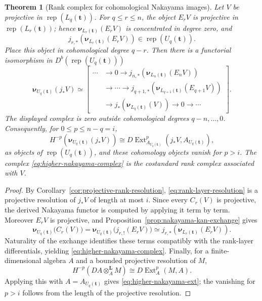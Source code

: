 \documentclass[12pt,reqno]{amsart}
\newtheorem{theorem}{Theorem}[section]
\theoremstyle{definition}
\theoremstyle{remark}
\newcommand{\Rep}{\operatorname{rep}}
\newcommand{\Ext}{\operatorname{Ext}}
\begin{document}
\begin{theorem}[Rank complex for cohomological Nakayama images]\label{thm:higher-nakayama-rank-complex}
Let $V$ be projective in $\Rep(L_q(\mathbf t))$.  For $q\le r\le n$, the
object $E_rV$ is projective in $\Rep(L_r(\mathbf t))$; hence
$\boldsymbol\nu_{L_r(\mathbf t)}(E_rV)$ is concentrated in degree zero, and
\[
j_{r,*}\!\left(\boldsymbol\nu_{L_r(\mathbf t)}(E_rV)\right)
\in\Rep(U_q(\mathbf t)).
\]
Place this object in cohomological degree $q-r$.  Then there is a functorial
isomorphism in $D^b(\Rep(U_q(\mathbf t)))$
\begin{equation}\label{eq:higher-nakayama-complex}
\boxed{
\boldsymbol\nu_{U_q(\mathbf t)}(j_*V)
\simeq
\left[
\begin{aligned}
\cdots&\longrightarrow 0\longrightarrow
j_{n,*}\!\left(\boldsymbol\nu_{L_n(\mathbf t)}(E_nV)\right)\\
&\longrightarrow\cdots\longrightarrow
j_{q+1,*}\!\left(\boldsymbol\nu_{L_{q+1}(\mathbf t)}(E_{q+1}V)\right)\\
&\longrightarrow
j_*\!\left(\boldsymbol\nu_{L_q(\mathbf t)}(V)\right)
\longrightarrow 0\longrightarrow\cdots
\end{aligned}
\right].}
\end{equation}
The displayed complex is zero outside cohomological degrees
$q-n,\ldots,0$.  Consequently, for $0\le p\le n-q=i$,
\begin{equation}\label{eq:higher-nakayama-ext}
H^{-p}\!\left(\boldsymbol\nu_{U_q(\mathbf t)}(j_*V)\right)
\cong
D\Ext^p_{A_{U_q(\mathbf t)}}
\!\left(j_*V,A_{U_q(\mathbf t)}\right),
\end{equation}
as objects of $\Rep(U_q(\mathbf t))$, and these cohomology objects vanish for
$p>i$.  The complex
\eqref{eq:higher-nakayama-complex} is the costandard rank complex associated
with $V$.
\end{theorem}

\begin{proof}
By Corollary~\ref{cor:projective-rank-resolution},
\eqref{eq:rank-layer-resolution} is a projective resolution of $j_*V$ of
length at most $i$.  Since every $C_r(V)$ is projective, the derived Nakayama
functor is computed by applying it term by term.  Moreover $E_rV$ is
projective, and Proposition~\ref{prop:nakayama-kan-exchange} gives
\[
\boldsymbol\nu_{U_q(\mathbf t)}\bigl(C_r(V)\bigr)
=
\boldsymbol\nu_{U_q(\mathbf t)}\bigl(j_{r,!}(E_rV)\bigr)
\simeq
j_{r,*}\!\left(\boldsymbol\nu_{L_r(\mathbf t)}(E_rV)\right).
\]
Naturality of the exchange identifies these terms compatibly with the
rank-layer differentials, yielding \eqref{eq:higher-nakayama-complex}.
Finally, for a finite-dimensional algebra $A$ and a bounded projective
resolution of $M$,
\[
H^{-p}(DA\otimes_A^{\mathbf L}M)
\cong
D\Ext_A^p(M,A).
\]
Applying this with $A=A_{U_q(\mathbf t)}$ gives
\eqref{eq:higher-nakayama-ext}; the vanishing for $p>i$ follows from the
length of the projective resolution.
\end{proof}
\end{document}
